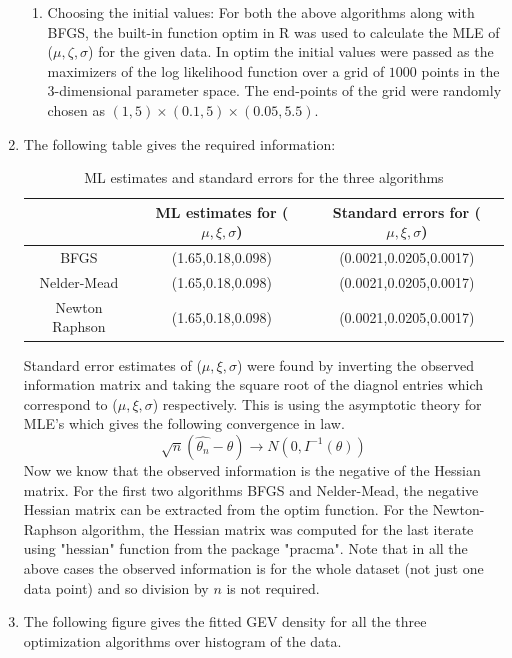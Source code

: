 \documentclass[12pt]{article}
\begin{document}
\begin{enumerate}[label=(\alph*)]
\begin{enumerate}[label=(\roman*)]
\item Choosing the initial values: For both the above algorithms along with BFGS, the built-in function optim in R was used to calculate the MLE of ($\mu, \zeta, \sigma$) for the given data. In optim the initial values were passed as the maximizers of the log likelihood function over a grid of $1000$ points in the 3-dimensional parameter space. The end-points of the grid were randomly chosen as $(1,5)\times(0.1,5)\times(0.05,5.5)$.
\end{enumerate}

\item The following table gives the required information:
\begin{table}[H]
\centering
\caption{ML estimates and standard errors for the three algorithms}
\label{my-label}
\begin{tabular}{|c|c|c|}
\hline
               & ML estimates for ($\mu, \xi, \sigma$)& Standard errors for ($\mu, \xi, \sigma$)\\ \hline
BFGS           &(1.65,0.18,0.098)&(0.0021,0.0205,0.0017)\\ \hline
Nelder-Mead    &(1.65,0.18,0.098)&(0.0021,0.0205,0.0017)\\ \hline
Newton Raphson &(1.65,0.18,0.098)&(0.0021,0.0205,0.0017)\\ \hline
\end{tabular}
\end{table}

Standard error estimates of ($\mu, \xi, \sigma$) were found by inverting the observed information matrix and taking the square root of the diagnol entries which correspond to ($\mu, \xi, \sigma$) respectively. This is using the asymptotic theory for MLE's which gives the following convergence in law.
\[\sqrt{n}(\hat{\theta_n}-\theta)\longrightarrow N(0, I^{-1}(\theta))\]
Now we know that the observed information is the negative of the Hessian matrix. For the first two algorithms BFGS and Nelder-Mead, the negative Hessian matrix can be extracted from the optim function. For the Newton-Raphson algorithm, the Hessian matrix was computed for the last iterate using "hessian" function from the package "pracma". Note that in all the above cases the observed information is for the whole dataset (not just one data point) and so division by $n$ is not required. 

\item The following figure gives the fitted GEV density for all the three optimization algorithms over histogram of the data. 


\end{enumerate}
\end{document}
